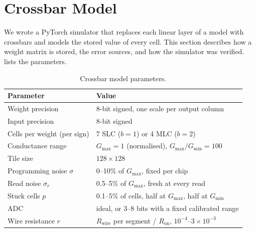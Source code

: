 \section{Crossbar Model}\label{sec:model}

We wrote a PyTorch simulator that replaces each linear layer of a model with crossbars and models the
stored value of every cell. This section describes how a weight matrix is stored, the error sources,
and how the simulator was verified.  lists the parameters.

\begin{table}[t]
\centering\footnotesize
\caption{Crossbar model parameters.}\label{tab:model}
\setlength{\tabcolsep}{4pt}
\begin{tabular}{@{}ll@{}}
\toprule
Parameter & Value \\
\midrule
Weight precision & 8-bit signed, one scale per output column \\
Input precision & 8-bit signed \\
Cells per weight (per sign) & 7 SLC ($b=1$) or 4 MLC ($b=2$) \\
Conductance range & $G_{\max}=1$ (normalised), $G_{\max}/G_{\min}=100$ \\
Tile size & $128\times128$ \\
Programming noise $\sigma$ & 0--10\% of $G_{\max}$, fixed per chip \\
Read noise $\sigma_r$ & 0.5--5\% of $G_{\max}$, fresh at every read \\
Stuck cells $p$ & 0.1--5\% of cells, half at $G_{\max}$, half at $G_{\min}$ \\
ADC & ideal, or 3--8 bits with a fixed calibrated range \\
Wire resistance $r$ & $R_{\text{wire}}$ per segment / $R_{\text{on}}$, $10^{-4}$--$3\times10^{-3}$ \\
\bottomrule
\end{tabular}
\end{table}

